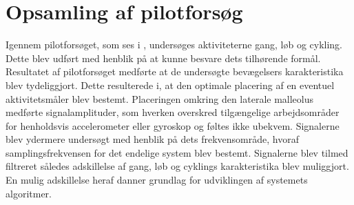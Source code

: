 \section{Opsamling af pilotforsøg}
Igennem pilotforsøget, som ses i , undersøges aktiviteterne gang, løb og cykling. Dette blev udført med henblik på at kunne besvare dets tilhørende formål. \\
Resultatet af pilotforsøget medførte at de undersøgte bevægelsers karakteristika blev tydeliggjort. Dette resulterede i, at den optimale placering af en eventuel aktivitetsmåler blev bestemt. Placeringen omkring den laterale malleolus medførte signalamplituder, som hverken overskred tilgængelige arbejdsområder for henholdsvis accelerometer eller gyroskop og føltes ikke ubekvem. Signalerne blev ydermere undersøgt med henblik på dets frekvensområde, hvoraf samplingsfrekvensen for det endelige system blev bestemt. Signalerne blev tilmed filtreret således adskillelse af gang, løb og cyklings karakteristika blev muliggjort. En mulig adskillelse heraf danner grundlag for udviklingen af systemets algoritmer. 


